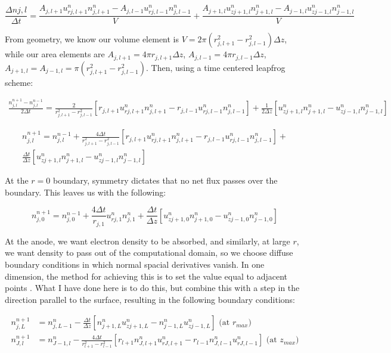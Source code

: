 \documentclass[11pt]{article}
\begin{document}
\begin{equation}
    \frac{\Delta n{j,l}}{\Delta t} = \frac{A_{j,l+1}u^n_{rj,l+1}n^n_{j,l+1}-A_{j,l-1}u^n_{rj,l-1}n^n_{j,l-1}}{V} + \frac{A_{j+1,l}u^n_{z j+1,l}n^n_{j+1,l}-A_{j-1,l}u^n_{zj-1,l}n^n_{j-1,l}}{V} 
\end{equation}

From geometry, we know our volume element is $V=2 \pi (r^2_{j,l+1}-r^2_{j,l-1}) \Delta z$, while our area elements are $A_{j,l+1} = 4 \pi r_{j,l+1} \Delta z$, $A_{j,l-1} = 4 \pi r_{j,l-1} \Delta z$, $A_{j+1,l}=A_{j-1,l}=\pi(r^2_{j,l+1}-r^2_{j,l-1})$. Then, using a time centered leapfrog scheme:

\begin{multline}
    \frac{ n^{n+1}_{j,l} - n^{n-1}_{j,l}}{2\Delta t} = \frac{2}{r^2_{j,l+1}-r^2_{j,l-1}} \left[ r_{j,l+1}u^n_{rj,l+1}n^n_{j,l+1}-r_{j,l-1}u^n_{rj,l-1}n^n_{j,l-1} \right] +  \frac{1}{2 \Delta z}\left[ u^n_{z j+1,l}n^n_{j+1,l}-u^n_{zj-1,l}n^n_{j-1,l} \right]
\end{multline}

\begin{multline}
    n^{n+1}_{j,l} = n^{n-1}_{j,l} + \frac{4\Delta t}{r^2_{j,l+1}-r^2_{j,l-1}}\left[ r_{j,l+1}u^n_{rj,l+1}n^n_{j,l+1}-r_{j,l-1}u^n_{rj,l-1}n^n_{j,l-1}\right] + \\
    \frac{\Delta t}{\Delta z} \left[ u^n_{z j+1,l}n^n_{j+1,l}-u^n_{zj-1,l}n^n_{j-1,l} \right]
\end{multline}

At the $r=0$ boundary, symmetry dictates that no net flux passes over the boundary. This leaves us with the following:

\begin{equation}
    n^{n+1}_{j,0} = n^{n-1}_{j,0} + \frac{4\Delta t}{r_{j,1}} u^n_{rj,1}n^n_{j,1} +
    \frac{\Delta t}{\Delta z} \left[ u^n_{z j+1,0}n^n_{j+1,0}-u^n_{zj-1,0}n^n_{j-1,0} \right]
\end{equation}

At the anode, we want electron density to be absorbed, and similarly, at large $r$, we want density to pass out of the computational domain, so we choose diffuse boundary conditions in which normal spacial derivatives vanish. In one dimension, the method for achieving this is to set the value equal to adjacent points \cite{computational}. What I have done here is to do this, but combine this with a step in the direction parallel to the surface, resulting in the following boundary conditions:

\begin{align}
n^{n+1}_{j,L} &= n^n_{j,L-1} - \frac{\Delta t}{\Delta z} \left[ n^n_{j+1,L}u^n_{z j+1, L}-n^n_{j-1,L}u^n_{z j-1,L} \right] \text{ (at $r_{max}$)} \\
n^{n+1}_{J,l} &= n^n_{J-1,l} - \frac{4 \Delta t}{r_{l+1}^2-r_{l-1}^2} \left[ r_{l+1}n^n_{J,l+1}u^n_{r J,l+1} - r_{l-1}n^n_{J,l-1}u^n_{r J,l-1}\right] \text{ (at $z_{max}$)}
\end{align}
\end{document}

